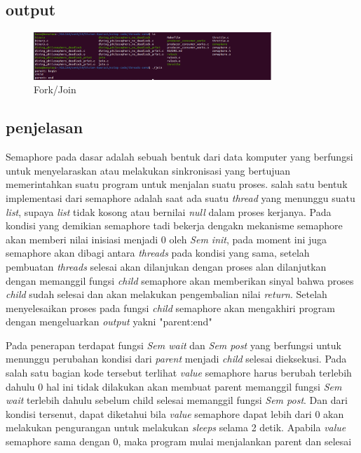 \documentclass[11pt,a4paper]{article}
\begin{document}
\vspace{2cm}
\subsection*{output}
\begin{figure}[h]
	\centering
	\includegraphics[width=0.8\textwidth]{Figure/testing/percobaan-join.png}
	\caption{Fork/Join}
\end{figure}

\subsection{penjelasan}
Semaphore pada dasar adalah sebuah bentuk dari data komputer yang berfungsi untuk menyelaraskan atau melakukan sinkronisasi yang bertujuan memerintahkan suatu program untuk menjalan suatu proses. salah satu bentuk implementasi dari semaphore adalah saat ada suatu  \textit{thread} yang menunggu suatu \textit{list}, supaya \textit{list} tidak kosong atau bernilai \textit{null} dalam proses  kerjanya. Pada kondisi yang demikian semaphore tadi bekerja dengakn mekanisme semaphore akan memberi nilai inisiasi menjadi 0 oleh \textit{Sem init}, pada moment ini juga semaphore akan dibagi antara \textit{threads} pada kondisi yang sama, setelah pembuatan \textit{threads} selesai akan dilanjukan dengan proses alan dilanjutkan dengan memanggil fungsi \textit{child} semaphore akan memberikan sinyal bahwa proses \textit{child} sudah selesai dan akan melakukan pengembalian nilai \textit{return}. Setelah menyelesaikan proses pada fungsi \textit{child} semaphore akan mengakhiri program dengan mengeluarkan \textit{output} yakni "parent:end" 

Pada penerapan terdapat fungsi \textit{Sem wait} dan \textit{Sem post} yang berfungsi untuk menunggu perubahan kondisi dari \textit{parent} menjadi \textit{child} selesai dieksekusi. Pada salah satu bagian kode tersebut terlihat \textit{value} semaphore harus berubah terlebih dahulu 0 hal ini tidak dilakukan akan membuat parent memanggil fungsi \textit{Sem wait} terlebih dahulu sebelum child selesai memanggil fungsi \textit{Sem post}. Dan dari kondisi tersenut, dapat diketahui bila \textit{value} semaphore dapat lebih dari 0 akan melakukan pengurangan untuk melakukan \textit{sleeps} selama 2 detik. Apabila \textit{value} semaphore sama dengan 0, maka program mulai menjalankan parent dan selesai
\end{document}
